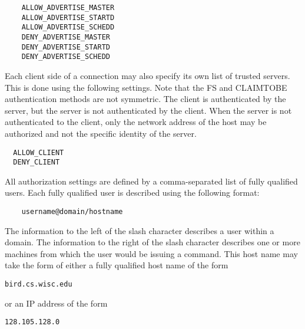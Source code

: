 \begin{verbatim}
    ALLOW_ADVERTISE_MASTER
    ALLOW_ADVERTISE_STARTD
    ALLOW_ADVERTISE_SCHEDD
    DENY_ADVERTISE_MASTER
    DENY_ADVERTISE_STARTD
    DENY_ADVERTISE_SCHEDD
\end{verbatim}


Each client side of a connection may also specify its own list of
trusted servers.  This is done using the following settings.  Note
that the FS and CLAIMTOBE authentication methods are not symmetric.
The client is authenticated by the server, but the server is not
authenticated by the client.  When the server is not authenticated to
the client, only the network address of the host may be authorized and
not the specific identity of the server.

\begin{verbatim}
  ALLOW_CLIENT
  DENY_CLIENT
\end{verbatim}
	
All authorization settings are defined by a comma-separated list of
fully qualified users.
Each fully qualified user
is described using the following format:
\begin{verbatim}
    username@domain/hostname
\end{verbatim}
The information to the left of the slash character describes
a user within a domain.
The information to the right of the slash character describes
one or more machines from which the user would be issuing a command. 
This host name may take the form of either a fully qualified host name
of the form
\begin{verbatim}
bird.cs.wisc.edu
\end{verbatim}
or an IP address
of the form
\begin{verbatim}
128.105.128.0
\end{verbatim}

